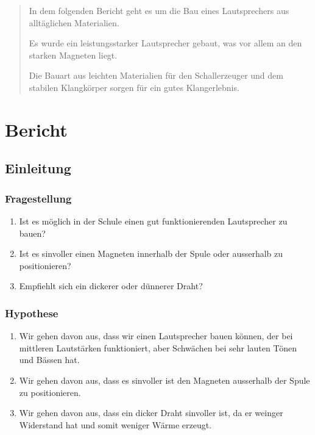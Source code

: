 \documentclass[a4paper,11pt]{report}
\begin{document}
\begin{abstract}
    In dem folgenden Bericht geht es um die Bau eines Lautsprechers aus alltäglichen Materialien.

    Es wurde ein leistungsstarker Lautsprecher gebaut, was vor allem an den starken Magneten liegt.

    Die Bauart aus leichten Materialien für den Schallerzeuger und dem stabilen Klangkörper sorgen für ein gutes Klangerlebnis.
    
\end{abstract}

\tableofcontents
\thispagestyle{empty}

\setcounter{page}{1}

\part{Bericht}

\chapter{Einleitung}
\section{Fragestellung}
\begin{enumerate}
    \item Ist es möglich in der Schule einen gut funktionierenden Lautsprecher zu bauen?
    \item Ist es sinvoller einen Magneten innerhalb der Spule oder ausserhalb zu positionieren?
    \item Empfiehlt sich ein dickerer oder dünnerer Draht?
\end{enumerate}
\section{Hypothese}
\begin{enumerate}
    \item Wir gehen davon aus, dass wir einen Lautsprecher bauen können, der bei mittleren Lautstärken funktioniert, aber Schwächen bei sehr lauten Tönen und Bässen hat.
    \item Wir gehen davon aus, dass es sinvoller ist den Magneten ausserhalb der Spule zu positionieren.
    \item Wir gehen davon aus, dass ein dicker Draht sinvoller ist, da er weinger Widerstand hat und somit weniger Wärme erzeugt.
\end{enumerate}
\end{document}
